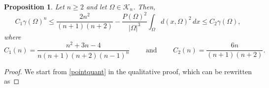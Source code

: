 \documentclass[oneside,a4paper,11pt,notitlepage]{article}
\newcommand{\abs}[1]{{\left|#1\right|}}
\theoremstyle{definition}
\theoremstyle{plain}
\newtheorem{prop}[teorema]{Proposition}
\theoremstyle{definition}
\begin{document}
\begin{prop}\label{prop:quantitative}
    Let $n\ge 2$ and let $\Omega \in \mathcal{K}_n$. Then,
    \begin{equation*}
        C_1\gamma(\Omega)^n\le \frac{2n^2}{(n+1)(n+2)}-\frac{P(\Omega)^2}{\abs{\Omega}^3} \int_{\Omega}d(x,\Omega)^2\, dx\le C_2\gamma(\Omega),
    \end{equation*}
      where
    \begin{equation*}
        C_1(n) = \frac{n^2+3n-4}{n(n+1)(n+2)(n-1)^{n}} \qquad \text{ and } \qquad C_2(n) = \frac{6n}{(n+1)(n+2)}. 
    \end{equation*}
\end{prop}


\begin{proof}
   We start from \eqref{pointquant} in the qualitative proof, which can be rewritten as
   

\end{proof}
\end{document}

